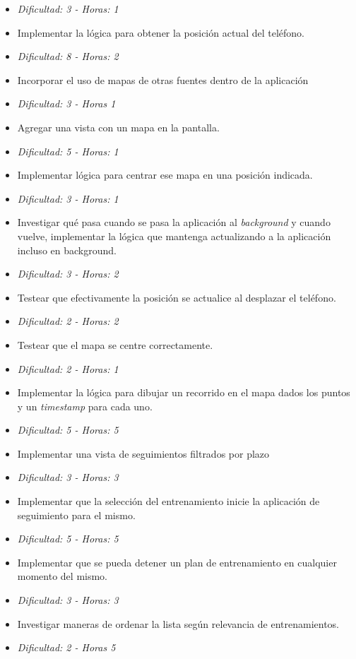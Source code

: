 \documentclass[10pt, a4paper,english,spanish]{article}
\begin{document}
\begin{itemize}
	\item[] \hfill \textit{Dificultad: 3 - Horas: 1}
	\item Implementar la lógica para obtener la posición actual del teléfono.
	\item[] \hfill \textit{Dificultad: 8 - Horas: 2}
	\item Incorporar el uso de mapas de otras fuentes dentro de la aplicación
	\item[] \hfill \textit{Dificultad: 3 - Horas 1}
	\item Agregar una vista con un mapa en la pantalla.
	\item[] \hfill \textit{Dificultad: 5 - Horas: 1}
	\item Implementar lógica para centrar ese mapa en una posición indicada.
	\item[] \hfill \textit{Dificultad: 3 - Horas: 1}
	\item Investigar qué pasa cuando se pasa la aplicación al \textit{background} y cuando vuelve, 
			implementar la lógica que mantenga actualizando a la aplicación incluso en background.
	\item[] \hfill \textit{Dificultad: 3 - Horas: 2}
	\item Testear que efectivamente la posición se actualice al desplazar el teléfono.
	\item[] \hfill \textit{Dificultad: 2 - Horas: 2}
	\item Testear que el mapa se centre correctamente.
	\item[] \hfill \textit{Dificultad: 2 - Horas: 1}
	\item Implementar la lógica para dibujar un recorrido en el mapa dados los puntos y un \textit{timestamp} para cada uno.
	\item[] \hfill \textit{Dificultad: 5 - Horas: 5}
	\item Implementar una vista de seguimientos filtrados por plazo	
	\item[] \hfill \textit{Dificultad: 3 - Horas: 3}
	\item Implementar que la selecci\'on del entrenamiento inicie la aplicación de seguimiento para el mismo.
	\item[] \hfill \textit{Dificultad: 5 - Horas: 5}
	\item Implementar que se pueda detener un plan de entrenamiento en cualquier momento del mismo.
	\item[] \hfill \textit{Dificultad: 3 - Horas: 3}
	\item Investigar maneras de ordenar la lista según relevancia de entrenamientos.
	\item[] \hfill \textit{Dificultad: 2 - Horas 5}
\end{itemize}
\end{document}

